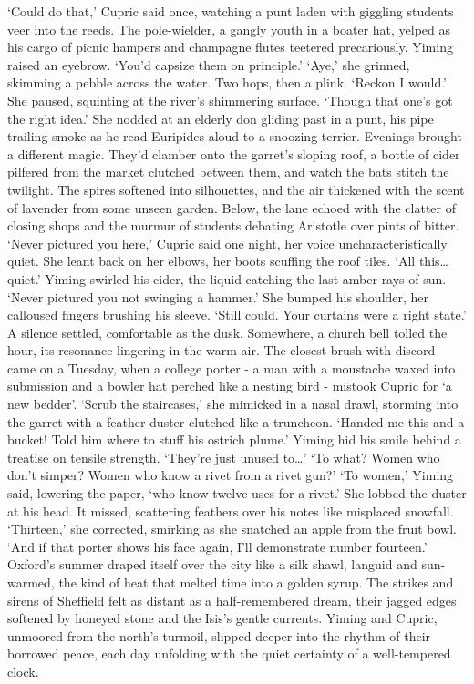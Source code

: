 `Could do that,' Cupric said once, watching a punt laden with giggling students veer into the reeds. The pole-wielder, a gangly youth in a boater hat, yelped as his cargo of picnic hampers and champagne flutes teetered precariously.
Yiming raised an eyebrow. `You'd capsize them on principle.'
`Aye,' she grinned, skimming a pebble across the water. Two hops, then a plink. `Reckon I would.' She paused, squinting at the river's shimmering surface. `Though that one's got the right idea.' She nodded at an elderly don gliding past in a punt, his pipe trailing smoke as he read Euripides aloud to a snoozing terrier.
Evenings brought a different magic. They'd clamber onto the garret's sloping roof, a bottle of cider pilfered from the market clutched between them, and watch the bats stitch the twilight. The spires softened into silhouettes, and the air thickened with the scent of lavender from some unseen garden. Below, the lane echoed with the clatter of closing shops and the murmur of students debating Aristotle over pints of bitter.
`Never pictured you here,' Cupric said one night, her voice uncharacteristically quiet. She leant back on her elbows, her boots scuffing the roof tiles. `All this\dots quiet.'
Yiming swirled his cider, the liquid catching the last amber rays of sun. `Never pictured you not swinging a hammer.'
She bumped his shoulder, her calloused fingers brushing his sleeve. `Still could. Your curtains were a right state.'
A silence settled, comfortable as the dusk. Somewhere, a church bell tolled the hour, its resonance lingering in the warm air.
The closest brush with discord came on a Tuesday, when a college porter - a man with a moustache waxed into submission and a bowler hat perched like a nesting bird - mistook Cupric for `a new bedder'.
`Scrub the staircases,' she mimicked in a nasal drawl, storming into the garret with a feather duster clutched like a truncheon. `Handed me this and a bucket! Told him where to stuff his ostrich plume.'
Yiming hid his smile behind a treatise on tensile strength. `They're just unused to\dots'
`To what? Women who don't simper? Women who know a rivet from a rivet gun?'
`To women,' Yiming said, lowering the paper, `who know twelve uses for a rivet.'
She lobbed the duster at his head. It missed, scattering feathers over his notes like misplaced snowfall.
`Thirteen,' she corrected, smirking as she snatched an apple from the fruit bowl. `And if that porter shows his face again, I'll demonstrate number fourteen.'
Oxford's summer draped itself over the city like a silk shawl, languid and sun-warmed, the kind of heat that melted time into a golden syrup. The strikes and sirens of Sheffield felt as distant as a half-remembered dream, their jagged edges softened by honeyed stone and the Isis's gentle currents. Yiming and Cupric, unmoored from the north's turmoil, slipped deeper into the rhythm of their borrowed peace, each day unfolding with the quiet certainty of a well-tempered clock.

